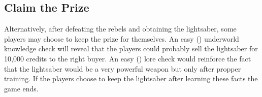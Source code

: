\documentclass[letterpaper]{article}
\begin{document}
\subsection{Claim the Prize}

Alternatively, after defeating the rebels and obtaining the lightsaber, some players may choose to keep the prize for themselves. An easy (\difficulty) underworld knowledge check will reveal that the players could probably sell the lightsaber for 10,000 credits to the right buyer. An easy (\difficulty) lore check would reinforce the fact that the lightsaber would be a very powerful weapon but only after propper training. If the players choose to keep the lightsaber after learning these facts the game ends.

\begin{figure}[p]
\end{figure}
\end{document}
